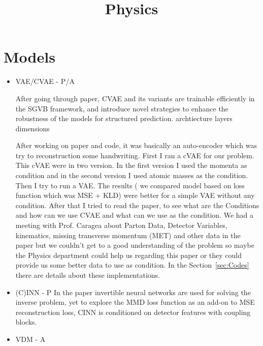 \documentclass{article}
\title{Physics}
\author{}
\date{}
\begin{document}
\maketitle

\section{Models}
\begin{itemize}
\item VAE/CVAE  - P/A

After going through \cite{NIPS2015_8d55a249} paper, CVAE and its variants are trainable efficiently in the SGVB framework, and introduce novel strategies to enhance the robustness of the models for structured prediction. archtiecture layers dimensions 

After working on \cite{kingma2013auto} paper and code, it was basically an auto-encoder which was try to reconstruction some handwriting. First I ran a cVAE for our problem. This cVAE were in two version. In the first version I used the momenta as condition and in the second version I used atomic masses as the condition. Then I try to run a VAE. The results ( we compared model based on loss function which was MSE + KLD) were better for a simple VAE without any condition. After that I tried to read the \cite{shmakov2024end} paper, to see what are the Conditions and how can we use CVAE and what can we use as the condition. We had a meeting with Prof. Caragea about Parton Data, Detector Variables, kinematics, missing transverse momentum (MET) and other data in the paper but we couldn't get to a good understanding of the problem so maybe the Physics department could help us regarding this paper or they could provide us some better data to use as condition.
In the Section~\ref{sec:Codes} there are details about these implementations.

\item (C)INN  - P
In the paper \cite{Bellagente_2020} invertible neural networks are used for solving the inverse problem, yet to explore the MMD loss function as an add-on to MSE reconstruction loss, CINN is conditioned on detector features with coupling blocks.
\item VDM - A 


\end{itemize}
\end{document}
